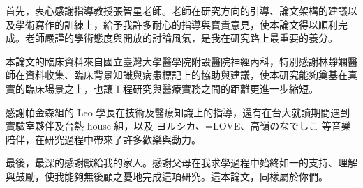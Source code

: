 
\begin{acknowledgement}

首先，衷心感謝指導教授張智星老師。老師在研究方向的引導、論文架構的建議以及學術寫作的訓練上，給予我許多耐心的指導與寶貴意見，使本論文得以順利完成。老師嚴謹的學術態度與開放的討論風氣，是我在研究路上最重要的養分。

本論文的臨床資料來自國立臺灣大學醫學院附設醫院神經內科，特別感謝林靜嫻醫師在資料收集、臨床背景知識與病患標記上的協助與建議，使本研究能夠奠基在真實的臨床場景之上，也讓工程研究與醫療實務之間的距離更進一步縮短。

感謝帕金森組的 Leo 學長在技術及醫療知識上的指導，還有在台大就讀期間遇到實驗室夥伴及台熱 house 組，以及 ヨルシカ、=LOVE、高嶺のなでしこ 等音樂陪伴，在研究過程中帶來了許多歡樂與動力。

最後，最深的感謝獻給我的家人。感謝父母在我求學過程中始終如一的支持、理解與鼓勵，使我能夠無後顧之憂地完成這項研究。這本論文，同樣屬於你們。

\end{acknowledgement}
